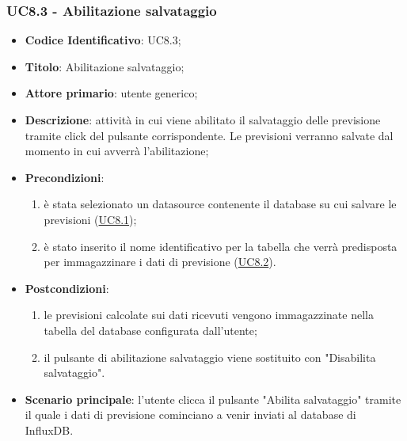 	\label{par:UC8.3}
	\subsubsection{UC8.3 - Abilitazione salvataggio}
		\begin{itemize}
			\item\textbf{Codice Identificativo}: UC8.3;
			\item\textbf{Titolo}: Abilitazione salvataggio;
			\item\textbf{Attore primario}: utente generico;
			\item\textbf{Descrizione}: attività in cui viene abilitato il salvataggio delle previsione tramite click del pulsante corrispondente. Le previsioni verranno salvate dal momento in cui avverrà l'abilitazione;
			\item\textbf{Precondizioni}:
				\begin{enumerate}
					\item è stata selezionato un datasource contenente il database su cui salvare le previsioni (\hyperref[par:UC8.1]{UC8.1});
					\item è stato inserito il nome identificativo per la tabella che verrà predisposta per immagazzinare i dati di previsione (\hyperref[par:UC8.2]{UC8.2}).
				\end{enumerate}
			\item\textbf{Postcondizioni}: 
			\begin{enumerate}
			\item le previsioni calcolate sui dati ricevuti vengono immagazzinate nella tabella del database configurata dall'utente;
			\item il pulsante di abilitazione salvataggio viene sostituito con "Disabilita salvataggio".
			\end{enumerate}
			\item\textbf{Scenario principale}: l'utente clicca il pulsante "Abilita salvataggio" tramite il quale i dati di previsione cominciano a venir inviati al database di InfluxDB.		
		\end{itemize}	
		
	\label{par:UC8.4}
